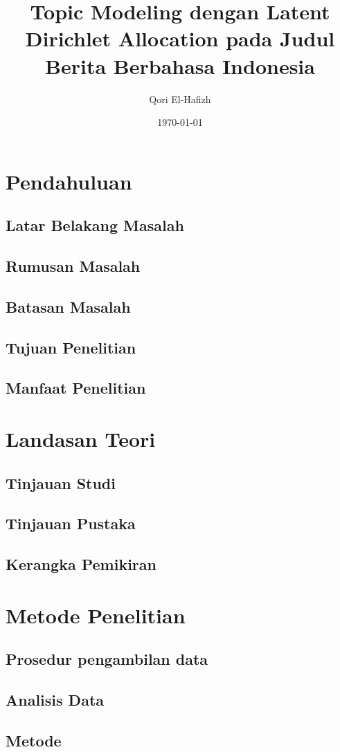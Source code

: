 \documentclass[a4paper,11pt]{report}
\title{Topic Modeling dengan Latent Dirichlet Allocation pada Judul Berita Berbahasa Indonesia}
\author{Qori El-Hafizh}
\date{\today}
\begin{document}
\maketitle

\begin{abstract}
\end{abstract}

\tableofcontents

\chapter{Pendahuluan}
\section{Latar Belakang Masalah}
\section{Rumusan Masalah}
\section{Batasan Masalah}
\section{Tujuan Penelitian}
\section{Manfaat Penelitian}

\chapter{Landasan Teori}
\section{Tinjauan Studi}
\section{Tinjauan Pustaka}
\section{Kerangka Pemikiran}

\chapter{Metode Penelitian}
\section{Prosedur pengambilan data}
\section{Analisis Data}
\section{Metode}
\end{document}
